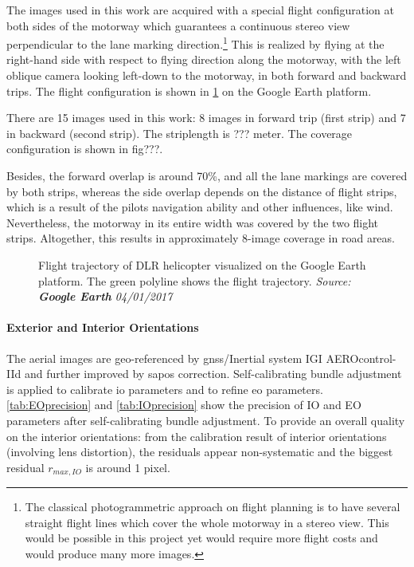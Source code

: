 The images used in this work are acquired with a special flight configuration at both sides of the motorway which guarantees a continuous stereo view perpendicular to the lane marking direction.\footnote{The classical photogrammetric approach on flight planning is to have several straight flight lines which cover the whole motorway in a stereo view. This would be possible in this project yet would require more flight costs and would produce many more images.} This is realized by flying at the right-hand side with respect to flying direction along the motorway, with the left oblique camera looking left-down to the motorway, in both forward and backward trips. The flight configuration is shown in \cref{fig:FlightTrajectory} on the Google Earth platform.

There are 15 images used in this work: 8 images in forward trip (first strip) and 7 in backward (second strip). The striplength is ??? meter. The coverage configuration is shown in fig???.

Besides, the forward overlap is around 70\%, and all the lane markings are covered by both strips, whereas the side overlap depends on the distance of flight strips, which is a result of the pilots navigation ability and other influences, like wind. Nevertheless, the motorway in its entire width was covered by the two flight strips. Altogether, this results in approximately 8-image coverage in road areas. 

\begin{figure}%
  \centering
  \caption{\small Flight trajectory of DLR helicopter visualized on the Google Earth platform. The green polyline shows the flight trajectory. \textit{Source: \textbf{Google Earth} 04/01/2017}}
  \label{fig:FlightTrajectory}
\end{figure}

\clearpage
\paragraph{Exterior and Interior Orientations}
The aerial images are geo-referenced by \gls{gnss}/Inertial system IGI AEROcontrol-IId and further improved by \gls{sapos} correction. Self-calibrating bundle adjustment is applied to calibrate \gls{io} parameters and to refine \gls{eo} parameters. \cref{tab:EOprecision} and \cref{tab:IOprecision} show the precision of IO and EO parameters after self-calibrating bundle adjustment. %
To provide an overall quality on the interior orientations: from the calibration result of interior orientations (involving lens distortion), the residuals appear non-systematic and the biggest residual $r_{max, IO}$ is around 1 pixel.%

